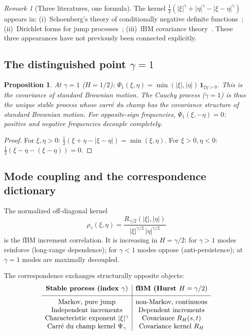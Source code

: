 \documentclass[11pt,a4paper]{article}
\theoremstyle{plain}
\newtheorem{proposition}[theorem]{Proposition}
\theoremstyle{definition}
\theoremstyle{remark}
\newtheorem{remark}[theorem]{Remark}
\begin{document}
\begin{remark}[Three literatures, one formula]\label{rem:three}
The kernel $\frac{1}{2}(|\xi|^\gamma + |\eta|^\gamma
- |\xi-\eta|^\gamma)$ appears in:
(i)~Schoenberg's theory of conditionally negative definite
functions~\cite{Schoenberg1938};
(ii)~Dirichlet forms for jump
processes~\cite{BoettcherSchillingWang2013};
(iii)~fBM covariance theory~\cite{Mishura2008}.
These three appearances have not previously been connected explicitly.
\end{remark}


\subsection{The distinguished point $\gamma = 1$}

\begin{proposition}\label{prop:self-dual}
At $\gamma = 1$ ($H = 1/2$):
$\Psi_1(\xi,\eta)
= \min(|\xi|, |\eta|)\,\mathbf{1}_{\xi\eta > 0}$.
This is the covariance of standard Brownian motion.
The Cauchy process ($\gamma = 1$) is thus the unique stable process
whose carr\'e du champ has the covariance structure of standard
Brownian motion.
For opposite-sign frequencies, $\Psi_1(\xi,-\eta) = 0$:
positive and negative frequencies decouple completely.
\end{proposition}

\begin{proof}
For $\xi, \eta > 0$:
$\frac{1}{2}(\xi + \eta - |\xi - \eta|) = \min(\xi, \eta)$.
For $\xi > 0, \eta < 0$:
$\frac{1}{2}(\xi - \eta - (\xi - \eta)) = 0$.
\end{proof}


\subsection{Mode coupling and the correspondence dictionary}

The normalized off-diagonal kernel
\[
  \rho_\gamma(\xi,\eta)
  = \frac{R_{\gamma/2}(|\xi|,|\eta|)}
    {|\xi|^{\gamma/2}\,|\eta|^{\gamma/2}}
\]
is the fBM increment correlation. It is increasing in $H = \gamma/2$:
for $\gamma > 1$ modes reinforce (long-range dependence);
for $\gamma < 1$ modes oppose (anti-persistence);
at $\gamma = 1$ modes are maximally decoupled.

The correspondence exchanges structurally opposite objects:
\[
\begin{array}{c|c}
\textbf{Stable process (index } \gamma\text{)}
& \textbf{fBM (Hurst } H = \gamma/2\text{)} \\[4pt]
\hline
\rule{0pt}{12pt}
\text{Markov, pure jump} & \text{non-Markov, continuous} \\
\text{Independent increments} & \text{Dependent increments} \\
\text{Characteristic exponent } |\xi|^\gamma &
  \text{Covariance } R_H(s,t) \\
\text{Carr\'e du champ kernel } \Psi_\gamma &
  \text{Covariance kernel } R_H
\end{array}
\]
\end{document}
